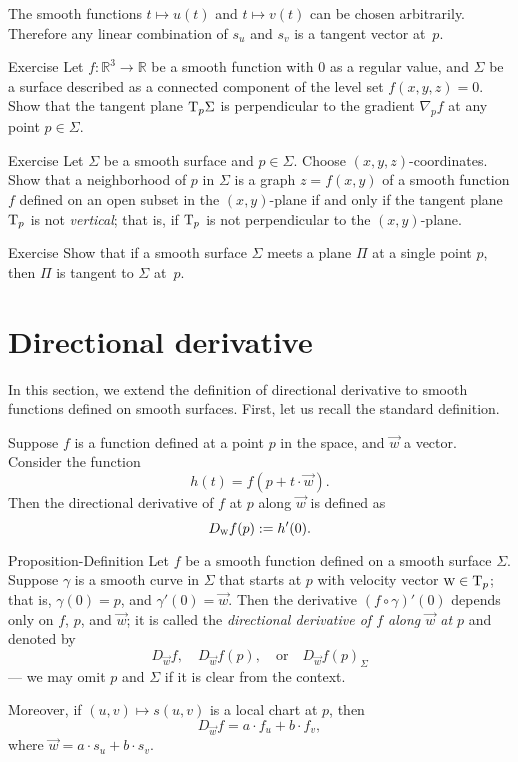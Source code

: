 The smooth functions $t\mapsto u(t)$ and $t\mapsto v(t)$ can be chosen arbitrarily.
Therefore any linear combination of $s_u$ and $s_v$ is a tangent vector at~$p$. 
\qeds


\begin{thm}{Exercise}\label{ex:tangent-normal}
Let $f:\mathbb{R}^3\to\mathbb{R}$ be a smooth function with $0$ as a regular value, and $\Sigma$ be a surface described as a connected component of the level set $f(x,y,z)=0$.
Show that the tangent plane $\mathrm{T}_p\Sigma$ is perpendicular to the gradient $\nabla_pf$ at any point $p\in\Sigma$.
\end{thm}

\begin{thm}{Exercise}\label{ex:vertical-tangent}
Let $\Sigma$ be a smooth surface and $p\in\Sigma$.
Choose $(x,y,z)$-coordinates.
Show that a neighborhood of $p$ in $\Sigma$ is a graph $z=f(x,y)$ of a smooth function $f$ defined on an open subset in the $(x,y)$-plane if and only if the tangent plane $\mathrm{T}_p$ is not {}\emph{vertical}; that is, if $\mathrm{T}_p$ is not perpendicular to the $(x,y)$-plane.
\end{thm}

\begin{thm}{Exercise}\label{ex:tangent-single-point}
Show that if a smooth surface $\Sigma$ meets a plane $\Pi$ at a single point $p$, then $\Pi$ is tangent to $\Sigma$ at~$p$.
\end{thm}


\section{Directional derivative}\label{sec:dirder}

In this section, we extend the definition of directional derivative to smooth functions defined on smooth surfaces.
First, let us recall the standard definition.

Suppose $f$ is a function defined at a point $p$ in the space, and $\vec w$ a vector.
Consider the function
\[h(t)=f(p+t\cdot\vec w).\]
Then the directional derivative of $f$ at $p$ along $\vec w$ is defined as 
\[D_{\text{\sc{w}}}f(p)\mathrel{:=} h'(0).\]

\begin{thm}{Proposition-Definition}\label{def:directional-derivative}
Let $f$ be a smooth function defined on a smooth surface $\Sigma$.
Suppose $\gamma$ is a smooth curve in $\Sigma$ that starts at $p$ with velocity vector $\text{\sc{w}}\in \mathrm{T}_p$;
that is, $\gamma(0)=p$, and $\gamma'(0)=\vec{w}$.
Then the derivative $(f\circ\gamma)'(0)$
depends only on $f$, $p$, and $\vec{w}$;
it is called the \emph{directional derivative of $f$ along $\vec{w}$ at $p$}
and denoted by
\[D_{\vec{w}}f,\quad D_{\vec{w}}f(p), \quad\text{or}\quad D_{\vec{w}}f(p)_\Sigma\] 
--- we may omit $p$ and $\Sigma$ if it is clear from the context.

Moreover, if $(u,v)\mapsto s(u,v)$ is a local chart at $p$, then 
\[D_{\vec{w}}f=a\cdot f_u+b\cdot f_v,\]
where $\vec{w}=a\cdot s_u +b\cdot s_v$. 
\end{thm}

